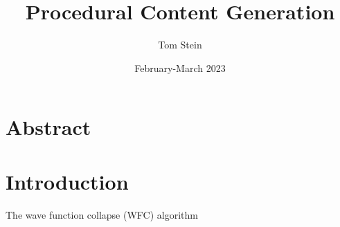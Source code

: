 \documentclass[
oneside,
fontsize=11pt
]{scrartcl}
\title{Procedural Content Generation}
\author{Tom Stein}
\date{February-March 2023}
\begin{document}


%






\newpage

 


\section*{Abstract}


\section{Introduction}


The wave function collapse (WFC) algorithm
\end{document}
